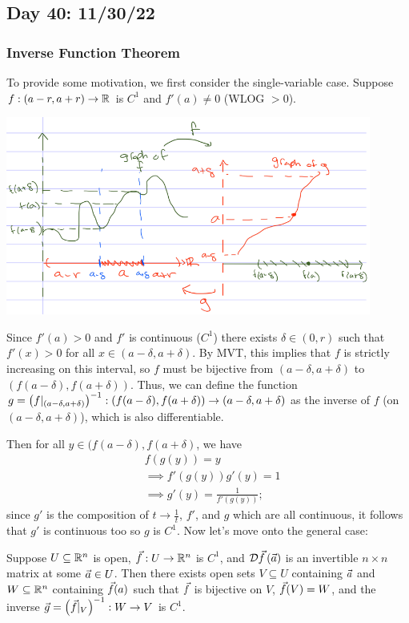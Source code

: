 \documentclass[main.tex]{subfiles}
\begin{document}
\subsection{Day 40: 11/30/22}
\subsubsection{Inverse Function Theorem}

To provide some motivation, we first consider the single-variable case. Suppose $f:\left( a - r, a + r \right)\to \mathbb R$ is $C^1$ and $f'(a) \neq 0$ (WLOG $> 0$).

\includegraphics[width = 0.9\textwidth]{inverse_function_theorem.PNG}

Since $f'(a) > 0$ and $f'$ is continuous ($C^1$) there exists $\delta \in (0, r)$ such that $f'(x) > 0$ for all $x\in (a - \delta, a + \delta)$. By MVT, this implies that $f$ is strictly increasing on this interval, so $f$ must be bijective from $(a - \delta, a + \delta)$ to $(f(a - \delta), f(a + \delta))$. Thus, we can define the function $g = \left( f |_{(a - \delta, a + \delta)} \right)^{-1} : (f(a - \delta), f(a + \delta)) \to (a - \delta, a + \delta)$ as the inverse of $f$ (on $(a - \delta, a + \delta)$), which is also differentiable.

Then for all $y\in (f(a - \delta), f(a + \delta)$, we have
\begin{align*}
    &f(g(y)) = y \\
    &\implies f'(g(y))g'(y) = 1 \\
    &\implies g'(y) = \frac{1}{f'(g(y))};
\end{align*}
since $g'$ is the composition of $t\to \frac{1}{t}$, $f'$, and $g$ which are all continuous, it follows that $g'$ is continuous too so $g$ is $C^1$. Now let's move onto the general case:

\begin{theorem}
    Suppose $U\subseteq \mathbb R^n$ is open, $\vec{f} : U \to \mathbb R^n$ is $C^1$, and $\mathcal{D}\vec{f}\left( \vec{a} \right)$ is an invertible $n\times n$ matrix at some $\vec{a}\in U$. Then there exists open sets $V\subseteq U$ containing $\vec{a}$ and $W\subseteq \mathbb R^n$ containing $\vec{f}(a)$ such that $\vec{f}$ is bijective on $V$, $\vec{f}(V) = W$, and the inverse $\vec{g} = \left( \vec{f} |_V \right)^{-1} : W \to V$ is $C^1$.
\end{theorem}
\end{document}
